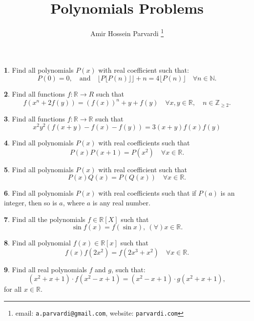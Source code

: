 \documentclass{article}
\theoremstyle{definition}
\newtheorem{p}{}
\begin{document}
\title{Polynomials Problems}\author{Amir Hossein Parvardi  \thanks{email: \texttt{a.parvardi@gmail.com}, website: \texttt{parvardi.com}}} \maketitle

\begin{p}
Find all polynomials $P(x)$ with real coefficient such that:
\[P(0)=0 , \quad \text{and} \quad \lfloor P \lfloor P(n)\rfloor \rfloor +n=4\lfloor P(n) \rfloor \quad \forall n \in \mathbb N.\]
\end{p}

\begin{p}
Find all functions $f: \mathbb R\to R$ such that
\[f(x^n+2f(y))=(f(x))^n +y+f(y) \quad  \forall x, y \in \mathbb R, \quad  n \in \mathbb Z_{\geq 2}.\]
\end{p}

\begin{p}
Find all functions $ f : \mathbb R\to \mathbb R$ such that
\[ x^2y^2 \left( f(x+y)-f(x)-f(y) \right)=3(x+y)f(x)f(y)\]
\end{p}

\begin{p}
Find all polynomials $P(x)$ with real coefficients such that
\[P(x)P(x + 1) = P(x^2) \quad \forall x \in \mathbb R.\]
\end{p}

\begin{p}
Find all polynomials $P(x)$ with real coefficient such that
\[P(x)Q(x)=P(Q(x)) \quad \forall x \in \mathbb R.\]
\end{p}


\begin{p}
Find all polynomials $P(x)$ with real coefficients such that if $P(a)$ is an integer, then so is $a$, where $a$ is any real number.
\end{p}


\begin{p}
Find all the polynomials $f\in \mathbb{R}[X]$ such that
\[\sin f(x)=f(\sin x),\ (\forall)x\in \mathbb{R}.\]
\end{p}


\begin{p}
Find all polynomial $f(x) \in \mathbb{R}[x] $ such that 
\[f(x)f(2x^2)=f(2x^3+x^2) \quad \forall  x\in \mathbb{R}.\]
\end{p}


\begin{p}
Find all real polynomials $f$ and $g$, such that:
\[(x^2+x+1)\cdot f(x^2-x+1)=(x^2-x+1)\cdot g(x^2+x+1), \]
for all $x\in\mathbb{R}$.
\end{p}
\end{document}
